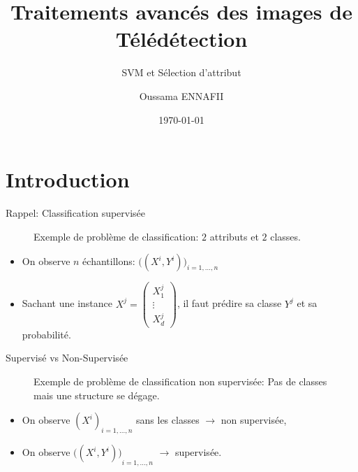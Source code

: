 \documentclass[8pt]{beamer}
\title{Traitements avancés des images de Télédétection}
\subtitle{SVM et Sélection d'attribut}
\author{Oussama ENNAFII}
\institute{ENSG}
\date{\today}
\begin{document}
	\begin{frame}[plain]
		\titlepage{}
	\end{frame}

	\section{Introduction}

	\begin{frame}{Rappel: Classification supervisée}
		\begin{figure}[H]
			\begin{center}
				
				\caption*{\tiny Exemple de problème de classification: $2$ attributs et $2$ classes.}
			\end{center}
		\end{figure}
		\begin{itemize}
			\item <1-> On observe $n$ échantillons: $\big((X^i, Y^i)\big)_{i=1,\dots,n}$
			\item <2-> Sachant une instance $X^j = \begin{pmatrix}
			X_1^j\\
			\vdots \\
			X_d^j
			\end{pmatrix}$, il faut prédire sa classe $Y^j$ et sa probabilité.
		\end{itemize}
	\end{frame}

	\begin{frame}{Supervisé vs Non-Supervisée}
		\begin{figure}[H]
			\begin{center}
				
				\caption*{\tiny Exemple de problème de classification non supervisée: Pas de classes mais une structure se dégage.}
			\end{center}
		\end{figure}
		\begin{itemize}
			\item <1-> On observe ${(X^i)}_{i=1,\dots,n}$ sans les classes $\longrightarrow$ non supervisée,
			\item <2-> On observe ${\big((X^i, Y^i)\big)}_{i=1,\dots,n}$ $\longrightarrow$ supervisée.
		\end{itemize}
	\end{frame}
\end{document}
